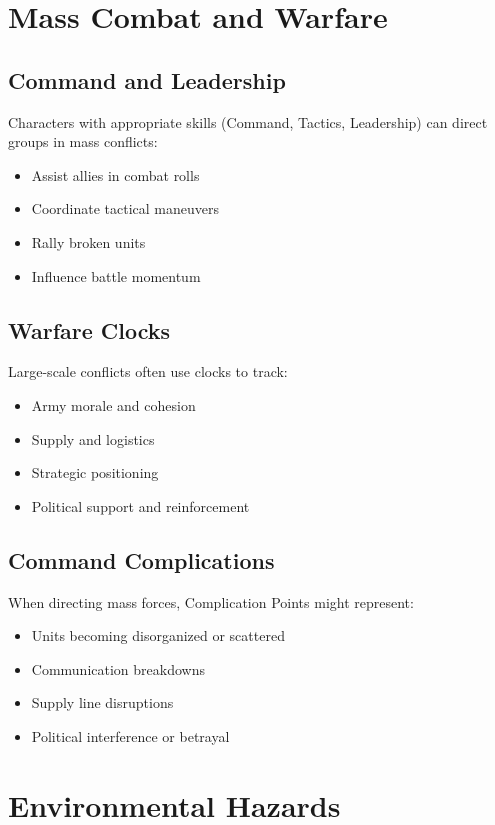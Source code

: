 \section{Mass Combat and Warfare}

\subsection{Command and Leadership}

Characters with appropriate skills (Command, Tactics, Leadership) can direct groups in mass conflicts:

\begin{itemize}
\item Assist allies in combat rolls
\item Coordinate tactical maneuvers
\item Rally broken units
\item Influence battle momentum
\end{itemize}

\subsection{Warfare Clocks}

Large-scale conflicts often use clocks to track:
\begin{itemize}
\item Army morale and cohesion
\item Supply and logistics
\item Strategic positioning
\item Political support and reinforcement
\end{itemize}

\subsection{Command Complications}

When directing mass forces, Complication Points might represent:
\begin{itemize}
\item Units becoming disorganized or scattered
\item Communication breakdowns
\item Supply line disruptions
\item Political interference or betrayal
\end{itemize}

\section{Environmental Hazards}

